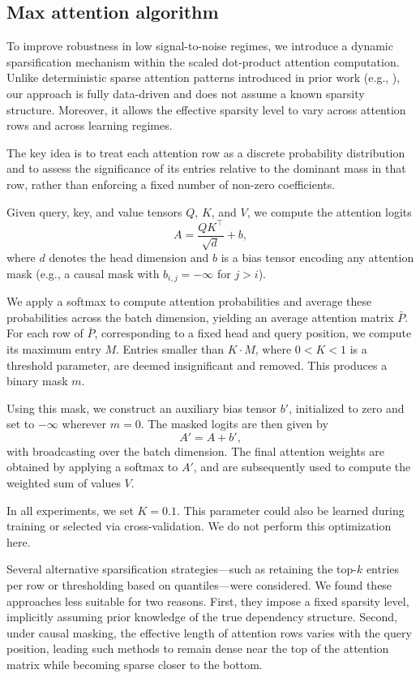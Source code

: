 \documentclass{article}
\begin{document}
\subsection{Max attention algorithm}\label{sparsity_algo}

To improve robustness in low signal-to-noise regimes, we introduce a dynamic sparsification mechanism within the scaled dot-product attention computation. Unlike deterministic sparse attention patterns introduced in prior work (e.g., \cite{child2019generating}), our approach is fully data-driven and does not assume a known sparsity structure. Moreover, it allows the effective sparsity level to vary across attention rows and across learning regimes.

The key idea is to treat each attention row as a discrete probability distribution and to assess the significance of its entries relative to the dominant mass in that row, rather than enforcing a fixed number of non-zero coefficients.

Given query, key, and value tensors \( Q \), \( K \), and \( V \), we compute the attention logits
\[
A = \frac{QK^\top}{\sqrt{d}} + b,
\]
where \( d \) denotes the head dimension and \( b \) is a bias tensor encoding any attention mask (e.g., a causal mask with \( b_{i,j} = -\infty \) for \( j > i \)).

We apply a softmax to compute attention probabilities and average these probabilities across the batch dimension, yielding an average attention matrix \( \bar{P} \). For each row of \( \bar{P} \), corresponding to a fixed head and query position, we compute its maximum entry \( M \). Entries smaller than \( K \cdot M \), where \( 0 < K < 1 \) is a threshold parameter, are deemed insignificant and removed. This produces a binary mask \( m \).

Using this mask, we construct an auxiliary bias tensor \( b' \), initialized to zero and set to \( -\infty \) wherever \( m = 0 \). The masked logits are then given by
\[
A' = A + b',
\]
with broadcasting over the batch dimension. The final attention weights are obtained by applying a softmax to \( A' \), and are subsequently used to compute the weighted sum of values \( V \).

In all experiments, we set \( K = 0.1 \). This parameter could also be learned during training or selected via cross-validation. We do not perform this optimization here.

Several alternative sparsification strategies—such as retaining the top-\( k \) entries per row or thresholding based on quantiles—were considered. We found these approaches less suitable for two reasons. First, they impose a fixed sparsity level, implicitly assuming prior knowledge of the true dependency structure. Second, under causal masking, the effective length of attention rows varies with the query position, leading such methods to remain dense near the top of the attention matrix while becoming sparse closer to the bottom.
\end{document}
